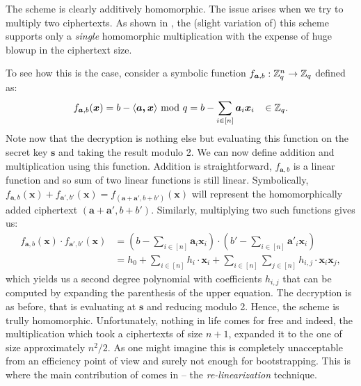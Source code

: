 The scheme is clearly additively homomorphic. The issue arises when we try to multiply two ciphertexts. As shown in \cite{one-mult}, the (slight variation of) this scheme supports only a \textit{single} homomorphic multiplication with the expense of huge blowup in the ciphertext size.

To see how this is the case, consider a symbolic function $f_{\boldsymbol{a},b} : \mathbb{Z}_q^n \rightarrow \mathbb{Z}_q$ defined as:
\[f_{\boldsymbol{a}, b}(\boldsymbol{x}) = b - \langle \boldsymbol{a, x} \rangle \text{ mod } q = b - \sum_{i \in [n]} \boldsymbol{a}_i \boldsymbol{x}_i \; \; \; \in \mathbb{Z}_q. \]
Note now that the decryption is nothing else but evaluating this function on the secret key $\bm{s}$ and taking the result modulo 2. We can now define addition and multiplication using this function. Addition is straightforward, $f_{\bm{a}, b}$ is a linear function and so sum of two linear functions is still linear. Symbolically, $f_{\bm{a},b}(\bm{x}) + f_{\bm{a}',b'}(\bm{x}) = f_{(\bm{a}+\bm{a}',b+b')}(\bm{x})$ will represent the homomorphically added ciphertext $(\bm{a}+\bm{a}',b+b')$. Similarly, multiplying two such functions gives us:
\begin{equation}\label{mult}
  \begin{split}
    f_{\bm{a},b}(\bm{x}) \cdot f_{\bm{a}',b'}(\bm{x}) & = ( b - \sum_{i \in [n]}\bm{a}_i \bm{x}_i) \cdot ( b' - \sum_{i \in [n]}\bm{a}'_i \bm{x}_i ) \\
						      & = h_0 + \sum_{i \in [n]}h_i \cdot \bm{x}_i + \sum_{i \in [n]} \sum_{j \in [n]} h_{i,j} \cdot \bm{x}_i \bm{x}_j,
\end{split}
\end{equation}
which yields us a second degree polynomial with coefficients $h_{i,j}$ that can be computed by expanding the parenthesis of the upper equation. The decryption is as before, that is evaluating at $\bm{s}$ and reducing modulo 2. Hence, the scheme is trully homomorphic. Unfortunately, nothing in life comes for free and indeed, the multiplication which took a ciphertexts of size $n+1$, expanded it to the one of size approximately $n^2/2$. As one might imagine this is completely unacceptable from an efficiency point of view and surely not enough for bootstrapping. This is where the main contribution of \cite{fhe-lwe} comes in -- the \textit{re-linearization} technique.
